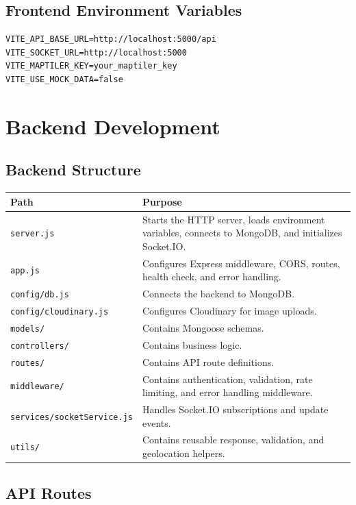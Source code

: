 \documentclass[12pt,a4paper]{article}
\begin{document}
\subsection{Frontend Environment Variables}

\begin{verbatim}
VITE_API_BASE_URL=http://localhost:5000/api
VITE_SOCKET_URL=http://localhost:5000
VITE_MAPTILER_KEY=your_maptiler_key
VITE_USE_MOCK_DATA=false
\end{verbatim}

\section{Backend Development}

\subsection{Backend Structure}

\begin{longtable}{p{4cm}p{10cm}}
\toprule
\textbf{Path} & \textbf{Purpose} \\
\midrule
\texttt{server.js} & Starts the HTTP server, loads environment variables, connects to MongoDB, and initializes Socket.IO. \\
\texttt{app.js} & Configures Express middleware, CORS, routes, health check, and error handling. \\
\texttt{config/db.js} & Connects the backend to MongoDB. \\
\texttt{config/cloudinary.js} & Configures Cloudinary for image uploads. \\
\texttt{models/} & Contains Mongoose schemas. \\
\texttt{controllers/} & Contains business logic. \\
\texttt{routes/} & Contains API route definitions. \\
\texttt{middleware/} & Contains authentication, validation, rate limiting, and error handling middleware. \\
\texttt{services/socketService.js} & Handles Socket.IO subscriptions and update events. \\
\texttt{utils/} & Contains reusable response, validation, and geolocation helpers. \\
\bottomrule
\end{longtable}

\subsection{API Routes}
\end{document}
